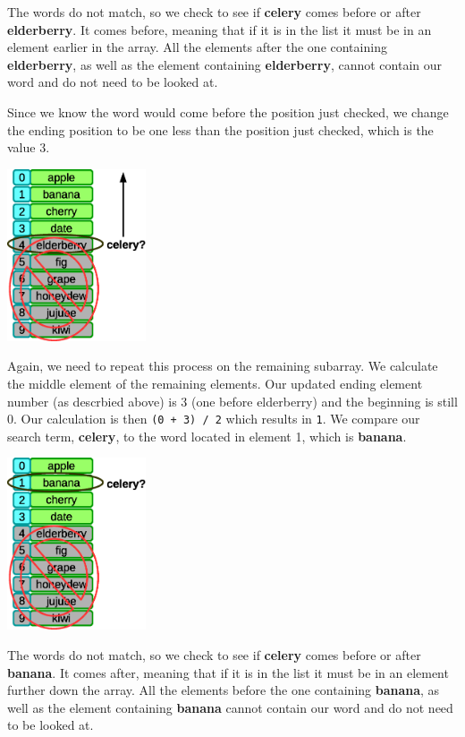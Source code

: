 The words do not match, so we check to see if \textbf{celery} comes before or after \textbf{elderberry}. It comes before, meaning that if it is in the list it must be in an element earlier in the array. All the elements after the one containing \textbf{elderberry}, as well as the element containing \textbf{elderberry}, cannot contain our word and do not need to be looked at.

Since we know the word would come before the position just checked, we change the ending position to be one less than the position just checked, which is the value 3.

\beforefig
\centerline{\includegraphics[height=2in]{figs2/recursion-binsearch-failure-2.eps}}
\afterfig

Again, we need to repeat this process on the remaining subarray. We calculate the middle element of the remaining elements. Our updated ending element number (as descrbied above) is 3 (one before elderberry) and the beginning is still 0. Our calculation is then \texttt{(0 + 3) / 2} which results in \texttt{1}. We compare our search term, \textbf{celery}, to the word located in element 1, which is \textbf{banana}.

\beforefig
\centerline{\includegraphics[height=2in]{figs2/recursion-binsearch-failure-3.eps}}
\afterfig

The words do not match, so we check to see if \textbf{celery} comes before or after \textbf{banana}. It comes after, meaning that if it is in the list it must be in an element further down the array. All the elements before the one containing \textbf{banana}, as well as the element containing \textbf{banana} cannot contain our word and do not need to be looked at.

